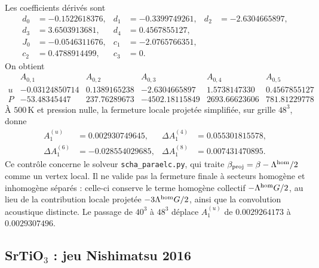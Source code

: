 Les coefficients dérivés sont
\begin{equation}
\begin{aligned}
d_0&=-0.1522618376,&d_1&=-0.3399749261,&
d_2&=-2.6304665897,\\
d_3&=3.6503913681,&d_4&=0.4567855127,\\
J_0&=-0.0546311676,&c_1&=-2.0765766351,\\
c_2&=0.4788914499,&c_3&=0.
\end{aligned}
\label{eq:core_nish_derived}
\end{equation}
On obtient
\begingroup\small
\begin{equation}
\begin{array}{c|rrrrr}
&A_{0,1}&A_{0,2}&A_{0,3}&A_{0,4}&A_{0,5}\\ \hline
u&-0.03124850714&0.1389165238&-2.6304665897&1.5738147330&0.4567855127\\
P&-53.48345447&237.76289673&-4502.18115849&2693.66623606&781.81229778
\end{array}
\label{eq:core_nish_final_kernel}
\end{equation}
\endgroup
À $500\,\mathrm K$ et pression nulle, la fermeture locale projetée
simplifiée, sur grille $48^3$, donne
\begin{equation}
\begin{aligned}
A_1^{(u)}&=0.002930749645,&
\Delta A_1^{(4)}&=0.055301815578,\\
\Delta A_1^{(6)}&=-0.028554029685,&
\Delta A_1^{(8)}&=0.007431470895.
\end{aligned}
\label{eq:core_nish_500k_check}
\end{equation}
Ce contrôle concerne le solveur \texttt{scha\_paraelc.py}, qui traite
$\beta_{\rm proj}=\beta-\Lambda^{\rm hom}/2$ comme un vertex local.
Il ne valide pas la fermeture finale à secteurs homogène et inhomogène
séparés : celle-ci conserve le terme homogène collectif
$-\Lambda^{\rm hom}G/2$, au lieu de la contribution locale projetée
$-3\Lambda^{\rm hom}G/2$, ainsi que la convolution acoustique distincte.
Le passage de $40^3$ à $48^3$ déplace $A_1^{(u)}$ de
$0.0029264173$ à $0.0029307496$.

\subsection{SrTiO$_3$ : jeu Nishimatsu 2016}


